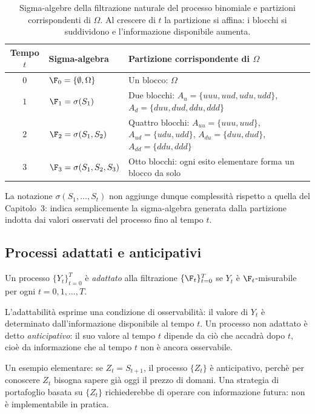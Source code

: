 \begin{table}[h]
\centering
\begin{tabular}{|c|p{4.0cm}|p{7.6cm}|}
\hline
\textbf{Tempo} $t$ & \textbf{Sigma-algebra} &
\textbf{Partizione corrispondente di $\Omega$}\\
\hline
$0$ & $\F_0=\{\emptyset,\Omega\}$ &
Un blocco: $\Omega$ \\
\hline
$1$ & $\F_1=\sigma(S_1)$ &
Due blocchi: $A_u=\{uuu,uud,udu,udd\}$,
$A_d=\{duu,dud,ddu,ddd\}$\\
\hline
$2$ & $\F_2=\sigma(S_1,S_2)$ &
Quattro blocchi: $A_{uu}=\{uuu,uud\}$, $A_{ud}=\{udu,udd\}$,
$A_{du}=\{duu,dud\}$, $A_{dd}=\{ddu,ddd\}$\\
\hline
$3$ & $\F_3=\sigma(S_1,S_2,S_3)$ &
Otto blocchi: ogni esito elementare forma un blocco da solo\\
\hline
\end{tabular}
\caption{Sigma-algebre della filtrazione naturale del processo
binomiale e partizioni corrispondenti di $\Omega$. Al crescere di
$t$ la partizione si affina: i blocchi si suddividono e
l'informazione disponibile aumenta.}
\label{tab:sigma-partizione}
\end{table}

\noindent
La notazione $\sigma(S_1,\ldots,S_t)$ non aggiunge dunque
complessit\`{a} rispetto a quella del Capitolo~3: indica semplicemente
la sigma-algebra generata dalla partizione indotta dai valori
osservati del processo fino al tempo $t$.

\subsection{Processi adattati e anticipativi}

\begin{definition}
\label{def:adattato}
Un processo $\{Y_t\}_{t=0}^{T}$ \`{e} \emph{adattato} alla filtrazione
$\{\F_t\}_{t=0}^{T}$ se $Y_t$ \`{e} $\F_t$-misurabile per ogni
$t=0,1,\ldots,T$.
\end{definition}

L'adattabilit\`{a} esprime una condizione di osservabilit\`{a}: il
valore di $Y_t$ \`{e} determinato dall'informazione disponibile al
tempo $t$. Un processo non adattato \`{e} detto \emph{anticipativo}:
il suo valore al tempo $t$ dipende da ci\`{o} che accadr\`{a} dopo
$t$, cio\`{e} da informazione che al tempo $t$ non \`{e} ancora
osservabile.

Un esempio elementare: se $Z_t=S_{t+1}$, il processo $\{Z_t\}$ \`{e}
anticipativo, perch\`{e} per conoscere $Z_t$ bisogna sapere gi\`{a}
oggi il prezzo di domani. Una strategia di portafoglio basata su
$\{Z_t\}$ richiederebbe di operare con informazione futura: non \`{e}
implementabile in pratica.

